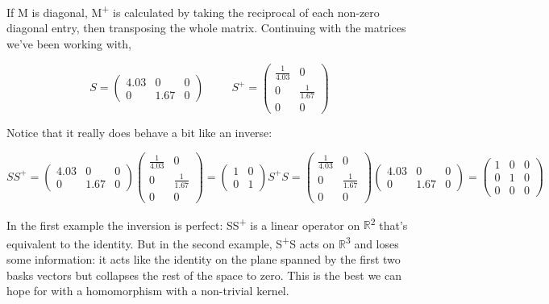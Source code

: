 \documentclass[oneside,english]{amsbook}
\numberwithin{section}{chapter}
\theoremstyle{plain}
\theoremstyle{definition}
\begin{document}
If M is diagonal, M\textsuperscript{+} is calculated by taking the
reciprocal of each non-zero diagonal entry, then transposing the whole
matrix. Continuing with the matrices we've been working with,

\[S = \begin{pmatrix}
	4.03 & 0 & 0 \\
	0 & 1.67 & 0
\end{pmatrix}\ \ \ \ \ \ \ \ \ \ \ S^{+} = \begin{pmatrix}
	\frac{1}{4.03} & 0 \\
	0 & \frac{1}{1.67} \\
	0 & 0
\end{pmatrix}\]

Notice that it really does behave a bit like an inverse:

\[{SS^{+} = \begin{pmatrix}
		4.03 & 0 & 0 \\
		0 & 1.67 & 0
	\end{pmatrix}\begin{pmatrix}
		\frac{1}{4.03} & 0 \\
		0 & \frac{1}{1.67} \\
		0 & 0
	\end{pmatrix} = \begin{pmatrix}
		1 & 0 \\
		0 & 1
	\end{pmatrix}
}{S^{+}S = \begin{pmatrix}
		\frac{1}{4.03} & 0 \\
		0 & \frac{1}{1.67} \\
		0 & 0
	\end{pmatrix}\begin{pmatrix}
		4.03 & 0 & 0 \\
		0 & 1.67 & 0
	\end{pmatrix} = \begin{pmatrix}
		1 & 0 & 0 \\
		0 & 1 & 0 \\
		0 & 0 & 0
\end{pmatrix}}\]

In the first example the inversion is perfect: SS\textsuperscript{+} is
a linear operator on $\mathbb{R}$\textsuperscript{2} that's equivalent to
the identity. But in the second example, S\textsuperscript{+}S acts on
$\mathbb{R}$\textsuperscript{3} and loses some information: it acts like
the identity on the plane spanned by the first two basks vectors but
collapses the rest of the space to zero. This is the best we can hope
for with a homomorphism with a non-trivial kernel.
\end{document}
